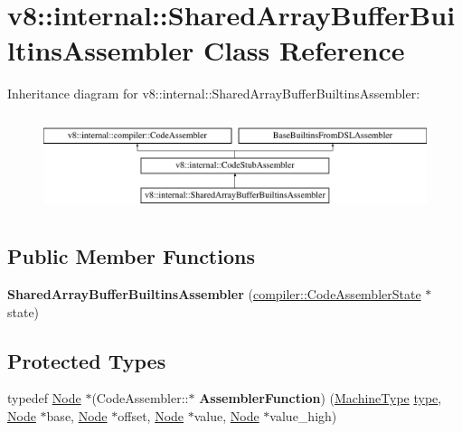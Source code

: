 \hypertarget{classv8_1_1internal_1_1SharedArrayBufferBuiltinsAssembler}{}\section{v8\+:\+:internal\+:\+:Shared\+Array\+Buffer\+Builtins\+Assembler Class Reference}
\label{classv8_1_1internal_1_1SharedArrayBufferBuiltinsAssembler}
Inheritance diagram for v8\+:\+:internal\+:\+:Shared\+Array\+Buffer\+Builtins\+Assembler\+:\begin{figure}[H]
\begin{center}
\leavevmode
\includegraphics[height=2.837838cm]{classv8_1_1internal_1_1SharedArrayBufferBuiltinsAssembler}
\end{center}
\end{figure}
\subsection*{Public Member Functions}
\begin{DoxyCompactItemize}
\item 
\mbox{\label{classv8_1_1internal_1_1SharedArrayBufferBuiltinsAssembler_a4765a530375d3cfc81062c0238ea94ae}} 
{\bfseries Shared\+Array\+Buffer\+Builtins\+Assembler} (\mbox{\hyperlink{classv8_1_1internal_1_1compiler_1_1CodeAssemblerState}{compiler\+::\+Code\+Assembler\+State}} $\ast$state)
\end{DoxyCompactItemize}
\subsection*{Protected Types}
\begin{DoxyCompactItemize}
\item 
\mbox{\label{classv8_1_1internal_1_1SharedArrayBufferBuiltinsAssembler_a89120b7950818a22809ecfc2083cdec6}} 
typedef \mbox{\hyperlink{classv8_1_1internal_1_1compiler_1_1Node}{Node}} $\ast$(Code\+Assembler\+::$\ast$ {\bfseries Assembler\+Function}) (\mbox{\hyperlink{classv8_1_1internal_1_1MachineType}{Machine\+Type}} \mbox{\hyperlink{classstd_1_1conditional_1_1type}{type}}, \mbox{\hyperlink{classv8_1_1internal_1_1compiler_1_1Node}{Node}} $\ast$base, \mbox{\hyperlink{classv8_1_1internal_1_1compiler_1_1Node}{Node}} $\ast$offset, \mbox{\hyperlink{classv8_1_1internal_1_1compiler_1_1Node}{Node}} $\ast$value, \mbox{\hyperlink{classv8_1_1internal_1_1compiler_1_1Node}{Node}} $\ast$value\+\_\+high)
\end{DoxyCompactItemize}
